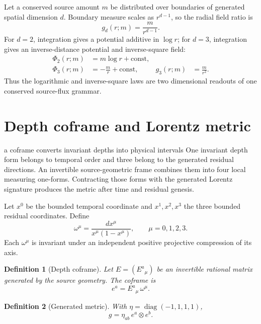 \documentclass[11pt]{article}
\numberwithin{equation}{section}
\newtheorem{definition}{Definition}[section]
\theoremstyle{remark}
\newcommand{\diag}{\operatorname{diag}}
\begin{document}
Let a conserved source amount $m$ be distributed over boundaries of generated spatial dimension $d$. Boundary measure scales as $r^{d-1}$, so the radial field ratio is
\begin{equation}
 g_d(r;m)=\frac{m}{r^{d-1}}.
\end{equation}
For $d=2$, integration gives a potential additive in $\log r$; for $d=3$, integration gives an inverse-distance potential and inverse-square field:
\begin{align}
\Phi_2(r;m)&=m\log r+\mathrm{const},\\
\Phi_3(r;m)&=-\frac{m}{r}+\mathrm{const},
&g_3(r;m)&=\frac{m}{r^2}.
\end{align}
Thus the logarithmic and inverse-square laws are two dimensional readouts of one conserved source-flux grammar.

\section{Depth coframe and Lorentz metric}
\begin{conceptledger}{a coframe converts invariant depths into physical intervals}
One invariant depth form belongs to temporal order and three belong to the generated residual directions. An invertible source-geometric frame combines them into four local measuring one-forms. Contracting those forms with the generated Lorentz signature produces the metric after time and residual genesis.
\end{conceptledger}

\label{sec:coframe}

Let $x^0$ be the bounded temporal coordinate and $x^1,x^2,x^3$ the three bounded residual coordinates. Define
\begin{equation}
\omega^\mu=\frac{dx^\mu}{x^\mu(1-x^\mu)},\qquad \mu=0,1,2,3.
\end{equation}
Each $\omega^\mu$ is invariant under an independent positive projective compression of its axis.

\begin{definition}[Depth coframe]
Let $E=(E^a{}_{\mu})$ be an invertible rational matrix generated by the source geometry. The coframe is
\begin{equation}
 e^a=E^a{}_{\mu}\,\omega^\mu.
\end{equation}
\end{definition}

\begin{definition}[Generated metric]
With $\eta=\diag(-1,1,1,1)$,
\begin{equation}
 g=\eta_{ab}\,e^a\otimes e^b.
\end{equation}
\end{definition}
\end{document}

